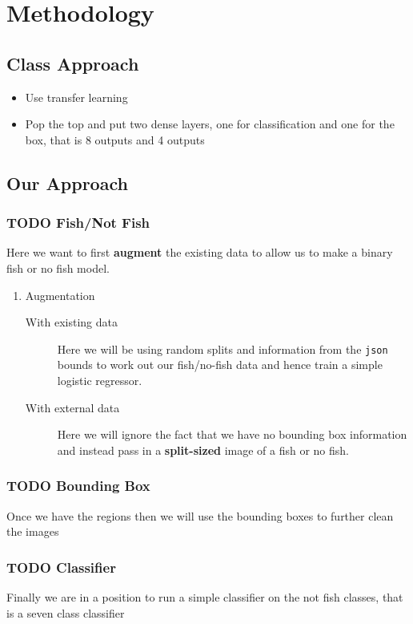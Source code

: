 \documentclass[12pt,a4paper,oneside,headinclude]{scrartcl}
\numberwithin{figure}{section}
\numberwithin{equation}{section}
\numberwithin{table}{section}
\begin{document}
\section{Methodology}
\label{sec:orgf756943}
\subsection{Class Approach}
\label{sec:org360b0d7}
\begin{itemize}
\item Use transfer learning
\item Pop the top and put two dense layers, one for classification and one for the
box, that is 8 outputs and 4 outputs
\end{itemize}
\subsection{Our Approach}
\label{sec:orgcf93800}
\subsubsection{{\bfseries\sffamily TODO} Fish/Not Fish}
\label{sec:org45bfd47}
Here we want to first \textbf{augment} the existing data to allow us to make a binary
fish or no fish model.
\begin{enumerate}
\item Augmentation
\label{sec:orgede5ef1}
\begin{description}
\item[{With existing data}] Here we will be using random splits and information from
the \texttt{json} bounds to work out our fish/no-fish data and hence train a
simple logistic regressor.
\item[{With external data}] Here we will ignore the fact that we have no bounding
box information and instead pass in a \textbf{split-sized} image of a fish or no
fish.
\end{description}
\end{enumerate}
\subsubsection{{\bfseries\sffamily TODO} Bounding Box}
\label{sec:org45659d4}
Once we have the regions then we will use the bounding boxes to further clean
the images
\subsubsection{{\bfseries\sffamily TODO} Classifier}
\label{sec:org5fb9939}
Finally we are in a position to run a simple classifier on the not fish classes,
that is a seven class classifier
\end{document}
